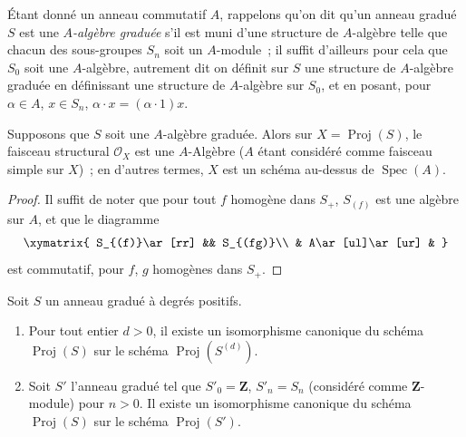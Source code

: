 \begin{env}[2.4.5]
\label{II.2.4.5-fr}
Étant donné un anneau commutatif $A$, rappelons qu'on dit qu'un anneau
gradué $S$ est une \emph{$A$-algèbre graduée} s'il est muni d'une structure
de $A$-algèbre telle que chacun des sous-groupes $S_n$ soit un $A$-module~;
il suffit d'ailleurs pour cela que $S_0$ soit
une $A$-algèbre, autrement dit on définit sur $S$ une structure de
$A$-algèbre graduée en définissant une structure de $A$-algèbre sur $S_0$,
et en posant, pour $\alpha\in A$, $x\in S_n$,
$\alpha\cdot x=(\alpha\cdot1)x$.
\end{env}

\begin{proposition}[2.4.6]
\label{II.2.4.6-fr}
Supposons que $S$ soit une $A$-algèbre graduée. Alors sur
$X=\operatorname{Proj}(S)$, le faisceau structural $\mathcal{O}_X$ est une
$A$-Algèbre ($A$ étant considéré comme faisceau simple sur $X$)~; en
d'autres termes, $X$ est un schéma au-dessus de $\operatorname{Spec}(A)$.
\end{proposition}

\begin{proof}
Il suffit de noter que pour tout $f$ homogène dans $S_+$, $S_{(f)}$ est une
algèbre sur $A$, et que le diagramme
\[
  \xymatrix{
    S_{(f)}\ar[rr] && S_{(fg)}\\
    & A\ar[ul]\ar[ur] &
  }
\]
est commutatif, pour $f$, $g$ homogènes dans $S_+$.
\end{proof}

\begin{proposition}[2.4.7]
\label{II.2.4.7-fr}
Soit $S$ un anneau gradué à degrés positifs.
\begin{enumerate}
  \item[\rm(i)] Pour tout entier $d>0$, il existe un isomorphisme canonique
    du schéma $\operatorname{Proj}(S)$ sur le schéma
    $\operatorname{Proj}(S^{(d)})$.
  \item[\rm(ii)] Soit $S'$ l'anneau gradué tel que $S'_0=\mathbf{Z}$,
    $S'_n=S_n$ (considéré comme $\mathbf{Z}$-module) pour $n>0$. Il existe un
    isomorphisme canonique du schéma $\operatorname{Proj}(S)$ sur le schéma
    $\operatorname{Proj}(S')$.
\end{enumerate}
\end{proposition}

